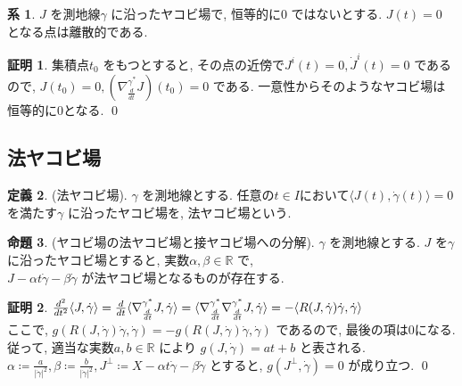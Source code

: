 \documentclass[10pt, fleqn, label-section=none]{bxjsarticle}
\theoremstyle{definition}
\newtheorem{dfn}{定義}[section]
\newtheorem{prop}[dfn]{命題}
\newtheorem{cor}[dfn]{系}
\newtheorem*{pf*}{証明}
\newcommand{\tbra}[1]{\mleft\langle#1\mright\rangle}
\newcommand{\ntbra}[1]{\langle#1\rangle}
\newcommand{\abs}[1]{\left|#1\right|}
\renewcommand{\-}{\hyphen}
\begin{document}
\begin{cor}
$J$ を測地線$\gamma$ に沿ったヤコビ場で, 恒等的に$0$ ではないとする. $J(t) = 0$ となる点は離散的である.
\end{cor}
\begin{pf*}
集積点$t_0$ をもつとすると, その点の近傍で$J^i (t) = 0, \dot J ^i (t) = 0$ であるので, $J(t_0) = 0, (\nabla^{\gamma^*} _{\frac{d}{dt} } J ) (t_0) = 0$ である. 一意性からそのようなヤコビ場は恒等的に0となる.
\qed
\end{pf*}



\subsection{法ヤコビ場}
\begin{dfn}(法ヤコビ場).
$\gamma$ を測地線とする.
任意の$t \in I$において$ \ntbra{J(t), \dot \gamma (t)} = 0 $ を満たす$\gamma$ に沿ったヤコビ場を, 法ヤコビ場という.
\end{dfn}

\begin{prop}(ヤコビ場の法ヤコビ場と接ヤコビ場への分解).
$\gamma$ を測地線とする. $J$ を$\gamma$ に沿ったヤコビ場とすると, 実数$\alpha , \beta \in \mathbb R$ で, \\
$J - \alpha t \dot \gamma - \beta \dot \gamma $ が法ヤコビ場となるものが存在する.
\end{prop}
\begin{pf*}
$\frac{d^2}{dt^2} \tbra{J, \dot \gamma } = \frac{d}{dt} \ntbra{\nabla^{\gamma^*} _{\frac{d}{dt} } J, \dot \gamma } = \ntbra{\nabla^{\gamma^*} _{\frac{d}{dt} } \nabla^{\gamma^*} _{\frac{d}{dt} } J, \dot \gamma}  = -\tbra{R(J,\dot \gamma) \dot \gamma, \dot \gamma}  $ \\
ここで, $g(R(J,\dot \gamma)\dot \gamma,\dot \gamma) = - g(R(J,\dot \gamma)\dot \gamma,\dot \gamma) $ であるので, 最後の項は0になる. 従って, 適当な実数$a,b \in \mathbb R$ により $ g(J, \dot \gamma) = at + b $ と表される. \\
$\alpha \coloneqq \frac{a}{\abs{\dot \gamma} ^2} , \beta \coloneqq \frac{b}{\abs{\dot \gamma} ^2}, J^\perp \coloneqq X - \alpha t \dot \gamma - \beta \dot \gamma $ とすると, $g(J^\perp, \dot \gamma) = 0$ が成り立つ.
\qed
\end{pf*}
\end{document}
